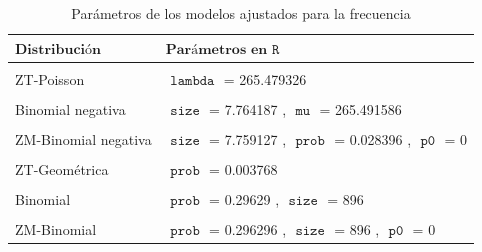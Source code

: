 \documentclass[
  letterpaper,
  onepage,
  openany]{scrreprt}
\begin{document}
\hypertarget{tbl-parametrosFrecuencia}{}
\begin{table}
\caption{\label{tbl-parametrosFrecuencia}Parámetros de los modelos ajustados para la frecuencia }\tabularnewline

\centering
\begin{tabular}{l|l}
\hline
\textbf{$\textbf{Distribución}$} & \textbf{$\textbf{Parámetros en } \texttt{R}$}\\
\hline
\cellcolor{gray!6}{Poisson} & \cellcolor{gray!6}{$\texttt{ lambda }$ = 265.479167}\\
\hline
ZT-Poisson & $\texttt{ lambda }$ = 265.479326\\
\hline
\cellcolor{gray!6}{ZM-Poisson} & \cellcolor{gray!6}{$\texttt{ lambda }$ = 265.473341 , $\texttt{ p0 }$ = 0}\\
\hline
Binomial negativa & $\texttt{ size }$ = 7.764187 , $\texttt{ mu }$ = 265.491586\\
\hline
\cellcolor{gray!6}{ZT-Binomial negativa} & \cellcolor{gray!6}{$\texttt{ size }$ = 7.762927 , $\texttt{ prob }$ = 0.028412}\\
\hline
ZM-Binomial negativa & $\texttt{ size }$ = 7.759127 , $\texttt{ prob }$ = 0.028396 , $\texttt{ p0 }$ = 0\\
\hline
\cellcolor{gray!6}{Geométrica} & \cellcolor{gray!6}{$\texttt{ prob }$ = 0.003753}\\
\hline
ZT-Geométrica & $\texttt{ prob }$ = 0.003768\\
\hline
\cellcolor{gray!6}{ZM-Geométrica} & \cellcolor{gray!6}{$\texttt{ prob }$ = 0.003766 , $\texttt{ p0 }$ = 0}\\
\hline
Binomial & $\texttt{ prob }$ = 0.29629 , $\texttt{ size }$ = 896\\
\hline
\cellcolor{gray!6}{ZT-Binomial} & \cellcolor{gray!6}{$\texttt{ prob }$ = 0.29629 , $\texttt{ size }$ = 896}\\
\hline
ZM-Binomial & $\texttt{ prob }$ = 0.296296 , $\texttt{ size }$ = 896 , $\texttt{ p0 }$ = 0\\
\hline
\end{tabular}
\end{table}
\end{document}
